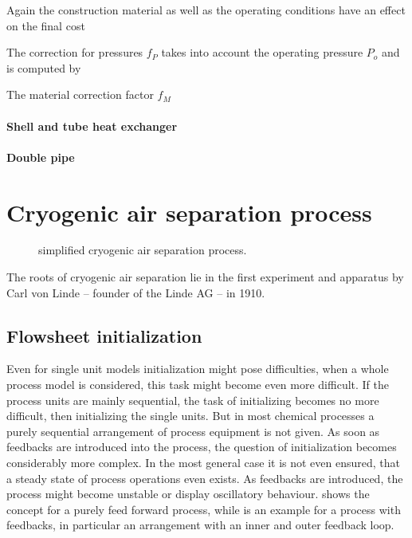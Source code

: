 		Again the construction material as well as the operating conditions have an effect on the
		final cost
		
		The correction for pressures $f_P$ takes into account the operating pressure $P_o$ and
		is computed by
		
		The material correction factor $f_M$
		
		\paragraph{Shell and tube heat exchanger}
		
		\paragraph{Double pipe}

\section{Cryogenic air separation process }	
    \begin{figure}
        \centering
        
        \caption{simplified cryogenic air separation process.}
        \label{fig:ASU_simple_coco}
    \end{figure}
    The roots of cryogenic air separation lie in the first experiment and apparatus by Carl von Linde -- founder of the 
    Linde AG -- in 1910. 
    
    \subsection{Flowsheet initialization}
        Even for single unit models initialization might pose difficulties, when a whole process model is considered,
        this task might become even more difficult. If the process units are mainly sequential, the task of initializing
        becomes no more difficult, then initializing the single units. But in most chemical processes a purely sequential
        arrangement of process equipment is not given. As soon as feedbacks are introduced into the process, the question
        of initialization becomes considerably more complex. In the most general case it is not even ensured, that a steady
        state of process operations even exists. As feedbacks are introduced, the process might become unstable or display
        oscillatory behaviour.  shows the concept for a purely feed forward process, while
         is an example for a process with feedbacks, in particular an arrangement with an inner
        and outer feedback loop.

